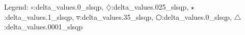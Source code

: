 Legend: {\color{NavyBlue}$\circ$}:delta\_values\0.0\_slsqp, {\color{Magenta}$\diamondsuit$}:delta\_values\0.025\_slsqp, {\color{Orange}$\star$}:delta\_values\0.1\_slsqp, {\color{CornflowerBlue}$\triangledown$}:delta\_values\0.35\_slsqp, {\color{red}$\varhexagon$}:delta\_values\1.0\_slsqp, {\color{YellowGreen}$\triangle$}:delta\_values\0.0001\_slsqp